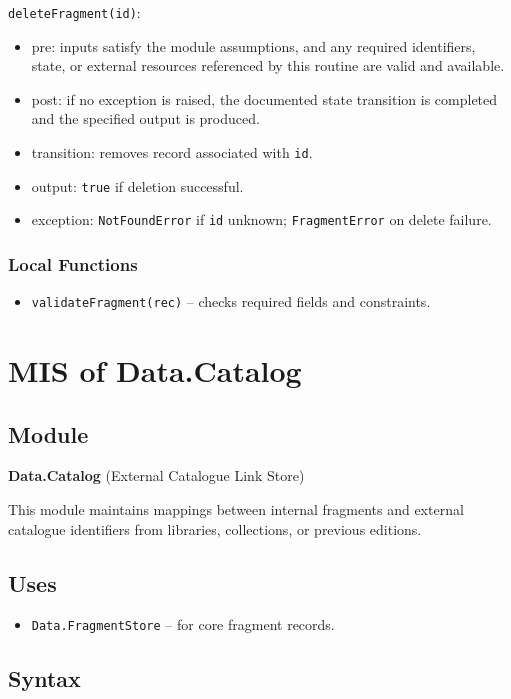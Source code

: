 \documentclass[12pt, titlepage]{article}
\begin{document}
\noindent \texttt{deleteFragment(id)}:
\begin{itemize}
    \item pre: inputs satisfy the module assumptions, and any required identifiers, state, or external resources referenced by this routine are valid and available.
    \item post: if no exception is raised, the documented state transition is completed and the specified output is produced.
    \item transition: removes record associated with \texttt{id}.
    \item output: \texttt{true} if deletion successful.
    \item exception: \texttt{NotFoundError} if \texttt{id} unknown; \texttt{FragmentError} on delete failure.
\end{itemize}

\subsubsection{Local Functions}
\begin{itemize}
    \item \texttt{validateFragment(rec)} – checks required fields and constraints.
\end{itemize}



\section{MIS of Data.Catalog} \label{Data.Catalog}

\subsection{Module}
\textbf{Data.Catalog} \; (External Catalogue Link Store)

This module maintains mappings between internal fragments and external catalogue identifiers from libraries, collections, or previous editions.

\subsection{Uses}
\begin{itemize}
    \item \texttt{Data.FragmentStore} – for core fragment records.
\end{itemize}

\subsection{Syntax}
\end{document}
